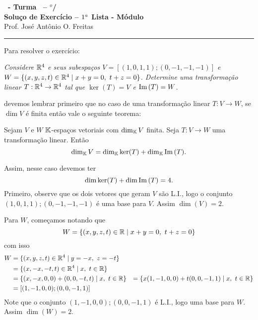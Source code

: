 \documentclass[12pt]{exam}
\begin{document}
    \begin{center}
        {\Large\bf \disciplina\ - Turma \turma\ -- \semestre$^{o}$/\ano} \\ \vspace{9pt} {\large\bf
            Solu\c{c}o de Exercício -- $1^a$ Lista - Módulo \numeromodulo}\\ \vspace{9pt} Prof. José Antônio O. Freitas
    \end{center}
    \hrule

    Para resolver o exercício:
    \begin{center}
        \begin{flushleft}
            \textit{Considere $\mathbb{R}^4$ e seus subespa\c{c}os $V = [(1,0,1,1);(0,-1,-1,-1)]$ e $W = \{(x,y,z,t) \in \mathbb{R}^4 \mid x + y = 0,\ t + z = 0\}$. Determine uma transforma\c{c}ão linear $T : \mathbb{R}^4 \to \mathbb{R}^4$ tal que $\ker(T) = V$ e ${\rm Im\,}(T) = W$.}
         \end{flushleft}
    \end{center}
    devemos lembrar primeiro que no caso de uma transforma\c{c}ão linear $T \colon V \to W$, se $\dim V$ é finita então vale o seguinte teorema:

    \begin{tcolorbox}[colback=green!30, colframe=green!80!blue, title=Teorema do Núcleo e da Imagem]
        Sejam $V$ e $W$ $\mathbb{K}$-espa\c{c}os vetoriais com $\dim_{\mathbb{K}}V$ finita. Seja $T : V \to W$ uma transforma\c{c}ão linear. Então
        \[
            \dim_{\mathbb{K}}V = \dim_{\mathbb{K}}\ker(T) + \dim_{\mathbb{K}}{\rm Im\,}(T).
        \]
    \end{tcolorbox}

    Assim, nesse caso devemos ter
    \[
        \dim\ker(T) + \dim{\rm Im\,}(T) = 4.
    \]
    Primeiro, observe que os dois vetores que geram $V$ são L.I., logo o conjunto ${(1, 0, 1, 1); (0,-1,-1,-1)}$ é uma base para $V$. Assim $\dim(V) = 2$.

    Para $W$, come\c{c}amos notando que
    \[
        W = \{(x, y, z, t) \in \mathbb{R} \mid x + y = 0,\ t + z = 0\}
    \]
    com isso
    \begin{align*}
        W &= \{(x, y, z, t) \in \mathbb{R}^4 \mid y = -x,\ z = -t\} \\ &= \{(x, -x, -t, t) \in \mathbb{R}^4 \mid x,\ t \in \mathbb{R}\} \\ &= \{(x, -x, 0, 0) + (0, 0, -t, t) \mid x,\ t \in \mathbb{R}\} &= \{x(1, -1, 0, 0) + t(0, 0, -1, 1) \mid x,\ t \in \mathbb{R}\} \\ &= [(1, -1, 0, 0); (0, 0, -1, 1)]
    \end{align*}
    Note que o conjunto ${(1, -1, 0, 0); (0, 0, -1, 1)}$ é L.I., logo uma base para $W$. Assim $\dim(W) = 2$.
\end{document}
